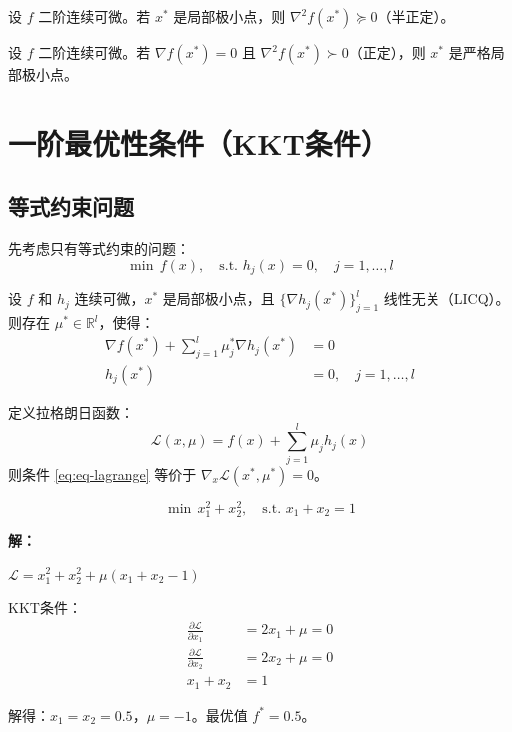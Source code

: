 \begin{theorem}[无约束二阶必要条件]
设 $f$ 二阶连续可微。若 $x^*$ 是局部极小点，则 $\nabla^2 f(x^*) \succeq 0$（半正定）。
\end{theorem}

\begin{theorem}[无约束二阶充分条件]
设 $f$ 二阶连续可微。若 $\nabla f(x^*) = 0$ 且 $\nabla^2 f(x^*) \succ 0$（正定），则 $x^*$ 是严格局部极小点。
\end{theorem}

\section{一阶最优性条件（KKT条件）}\label{sec:ch6-kkt}

\subsection{等式约束问题}

先考虑只有等式约束的问题：
\[
\min \, f(x), \quad \text{s.t. } h_j(x) = 0, \quad j = 1, \ldots, l
\]

\begin{theorem}[等式约束一阶必要条件]
设 $f$ 和 $h_j$ 连续可微，$x^*$ 是局部极小点，且 $\{\nabla h_j(x^*)\}_{j=1}^l$ 线性无关（LICQ）。则存在 $\mu^* \in \mathbb{R}^l$，使得：
\begin{align}
\nabla f(x^*) + \sum_{j=1}^l \mu_j^* \nabla h_j(x^*) &= 0 \label{eq:eq-lagrange} \\
h_j(x^*) &= 0, \quad j = 1, \ldots, l
\end{align}
\end{theorem}

\begin{conceptbox}[拉格朗日函数]
定义拉格朗日函数：
\[
\mathcal{L}(x, \mu) = f(x) + \sum_{j=1}^l \mu_j h_j(x)
\]
则条件 \eqref{eq:eq-lagrange} 等价于 $\nabla_x \mathcal{L}(x^*, \mu^*) = 0$。
\end{conceptbox}

\begin{example}[等式约束问题]
\[
\min \, x_1^2 + x_2^2, \quad \text{s.t. } x_1 + x_2 = 1
\]

\textbf{解：}

$\mathcal{L} = x_1^2 + x_2^2 + \mu(x_1 + x_2 - 1)$

KKT条件：
\begin{align*}
\frac{\partial \mathcal{L}}{\partial x_1} &= 2x_1 + \mu = 0 \\
\frac{\partial \mathcal{L}}{\partial x_2} &= 2x_2 + \mu = 0 \\
x_1 + x_2 &= 1
\end{align*}

解得：$x_1 = x_2 = 0.5$，$\mu = -1$。最优值 $f^* = 0.5$。
\end{example}

